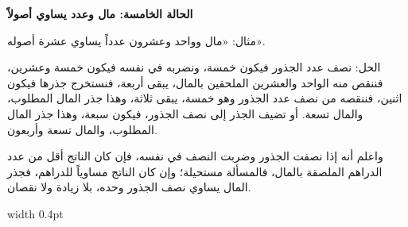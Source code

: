 \documentclass[11pt,a4paper]{book}
\begin{document}
\noindent\begin{minipage}[t]{0.48\textwidth}
\raggedleft

\begin{Arabic}
\textbf{الحالة الخامسة: مال وعدد يساوي أصولاً}

مثال: «مال وواحد وعشرون عدداً يساوي عشرة أصوله».

الحل: نصف عدد الجذور فيكون خمسة، ونضربه في نفسه فيكون خمسة وعشرين، فننقص منه الواحد والعشرين الملحقين بالمال، يبقى أربعة، فنستخرج جذرها فيكون اثنين، فننقصه من نصف عدد الجذور وهو خمسة، يبقى ثلاثة، وهذا جذر المال المطلوب، والمال تسعة. أو تضيف الجذر إلى نصف الجذور، فيكون سبعة، وهذا جذر المال المطلوب، والمال تسعة وأربعون.

واعلم أنه إذا نصفت الجذور وضربت النصف في نفسه، فإن كان الناتج أقل من عدد الدراهم الملصقة بالمال، فالمسألة مستحيلة؛ وإن كان الناتج مساوياً للدراهم، فجذر المال يساوي نصف الجذور وحده، بلا زيادة ولا نقصان.
\end{Arabic}

\end{minipage}%
\hfill\vrule width 0.4pt\hfill
\end{document}
